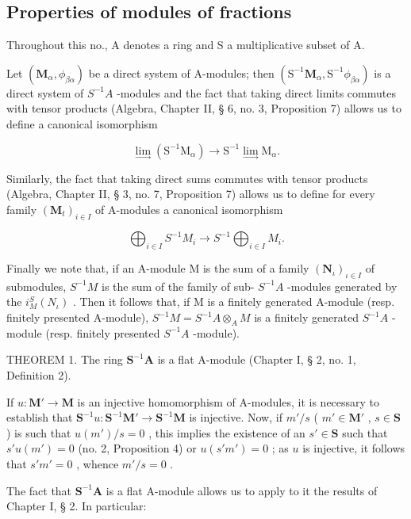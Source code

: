 \subsection{Properties of modules of fractions}

Throughout this no., A denotes a ring and S a multiplicative subset of A.

Let \((\mathbf{M}_{\alpha}, \phi_{\beta\alpha})\) be a direct system of A-modules; then \((\mathrm{S}^{-1}\mathbf{M}_{\alpha}, \mathrm{S}^{-1}\phi_{\beta\alpha})\) is a direct system of \(S^{-1}A\) -modules and the fact that taking direct limits commutes with tensor products (Algebra, Chapter II, § 6, no. 3, Proposition 7) allows us to define a canonical isomorphism

\[
\lim _ {\longrightarrow} \left(\mathrm{S} ^ {- 1} \mathrm{M} _ {\alpha}\right)\rightarrow \mathrm{S} ^ {- 1} \lim _ {\longrightarrow} \mathrm{M} _ {\alpha}.
\]

Similarly, the fact that taking direct sums commutes with tensor products (Algebra, Chapter II, § 3, no. 7, Proposition 7) allows us to define for every family \((\mathbf{M}_t)_{i\in I}\) of A-modules a canonical isomorphism

\[
\bigoplus_ {i \in I} S ^ {- 1} M _ {i} \rightarrow S ^ {- 1} \bigoplus_ {i \in I} M _ {i}.
\]

Finally we note that, if an A-module M is the sum of a family \((\mathbf{N}_{\iota})_{\iota\in I}\) of submodules, \(S^{-1}M\) is the sum of the family of sub- \(S^{-1}A\) -modules generated by the \(i_{M}^{S}(N_{\iota})\) . Then it follows that, if M is a finitely generated A-module (resp. finitely presented A-module), \(S^{-1}M = S^{-1}A \otimes_{A} M\) is a finitely generated \(S^{-1}A\) -module (resp. finitely presented \(S^{-1}A\) -module).

THEOREM 1. The ring \(\mathbf{S}^{-1}\mathbf{A}\) is a flat A-module (Chapter I, § 2, no. 1, Definition 2).

If \(u: \mathbf{M}' \to \mathbf{M}\) is an injective homomorphism of A-modules, it is necessary to establish that \(\mathbf{S}^{-1}u: \mathbf{S}^{-1}\mathbf{M}' \to \mathbf{S}^{-1}\mathbf{M}\) is injective. Now, if \(m'/s\) ( \(m' \in \mathbf{M}'\) , \(s \in \mathbf{S}\) ) is such that \(u(m')/s = 0\) , this implies the existence of an \(s' \in \mathbf{S}\) such that \(s'u(m') = 0\) (no. 2, Proposition 4) or \(u(s'm') = 0\) ; as \(u\) is injective, it follows that \(s'm' = 0\) , whence \(m'/s = 0\) .

The fact that \(\mathbf{S}^{-1}\mathbf{A}\) is a flat A-module allows us to apply to it the results of Chapter I, § 2. In particular:

